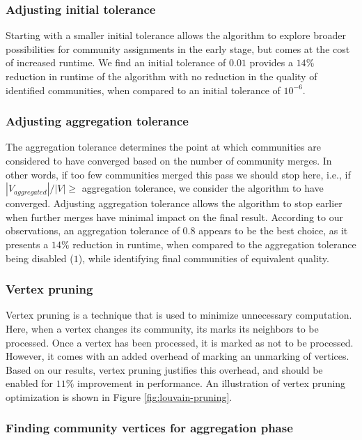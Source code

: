 \subsubsection{Adjusting initial tolerance}

Starting with a smaller initial tolerance allows the algorithm to explore broader possibilities for community assignments in the early stage, but comes at the cost of increased runtime. We find an initial tolerance of $0.01$ provides a $14\%$ reduction in runtime of the algorithm with no reduction in the quality of identified communities, when compared to an initial tolerance of $10^{-6}$.


\subsubsection{Adjusting aggregation tolerance}

The aggregation tolerance determines the point at which communities are considered to have converged based on the number of community merges. In other words, if too few communities merged this pass we should stop here, i.e., if $|V_{aggregated}|/|V| \geq$ aggregation tolerance, we consider the algorithm to have converged. Adjusting aggregation tolerance allows the algorithm to stop earlier when further merges have minimal impact on the final result. According to our observations, an aggregation tolerance of $0.8$ appears to be the best choice, as it presents a $14\%$ reduction in runtime, when compared to the aggregation tolerance being disabled ($1$), while identifying final communities of equivalent quality.


\subsubsection{Vertex pruning}

Vertex pruning is a technique that is used to minimize unnecessary computation. Here, when a vertex changes its community, its marks its neighbors to be processed. Once a vertex has been processed, it is marked as not to be processed. However, it comes with an added overhead of marking an unmarking of vertices. Based on our results, vertex pruning justifies this overhead, and should be enabled for $11\%$ improvement in performance. An illustration of vertex pruning optimization is shown in Figure \ref{fig:louvain-pruning}.




\subsubsection{Finding community vertices for aggregation phase}

